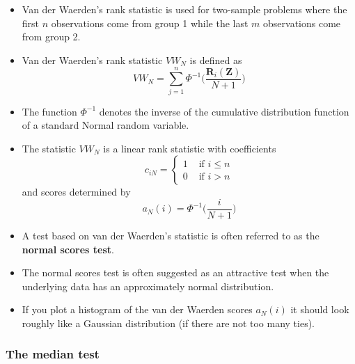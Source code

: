 \documentclass[]{book}
\begin{document}
\begin{itemize}
\item
  Van der Waerden's rank statistic is used for two-sample problems
  where the first \(n\) observations come from group 1 while the last
  \(m\) observations come from group 2.
\item
  Van der Waerden's rank statistic \(VW_{N}\) is defined as
  \begin{equation}
  VW_{N} = \sum_{j=1}^{n} \Phi^{-1}\Bigg( \frac{\mathbf{R}_{i}( \mathbf{Z})}{N+1} \Bigg)
  \end{equation}
\item
  The function \(\Phi^{-1}\) denotes the inverse of the cumulative distribution
  function of a standard Normal random variable.
\item
  The statistic \(VW_{N}\) is a linear rank statistic with coefficients
  \begin{equation}
  c_{iN} = \begin{cases}
   1 & \textrm{ if } i \leq n \\
   0 & \textrm{ if } i > n 
   \end{cases}
  \end{equation}
  and scores determined by
  \begin{equation}
  a_{N}(i) = \Phi^{-1}\Big(  \frac{i}{N+1} \Big)
  \end{equation}
\item
  A test based on van der Waerden's statistic is often referred to as
  the \textbf{normal scores test}.
\item
  The normal scores test is often suggested as an attractive test when
  the underlying data has an approximately normal distribution.
\item
  If you plot a histogram of the van der Waerden scores \(a_{N}(i)\) it should look
  roughly like a Gaussian distribution (if there are not too many ties).
\end{itemize}

\hypertarget{the-median-test}{%
\subsubsection{The median test}\label{the-median-test}}
\end{document}
